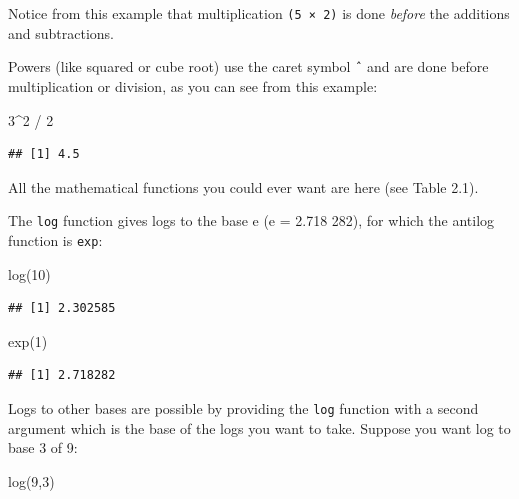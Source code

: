 \documentclass[
]{book}
\newenvironment{Shaded}{\begin{snugshade}}{\end{snugshade}}
\newcommand{\DecValTok}[1]{\textcolor[rgb]{0.00,0.00,0.81}{#1}}
\newcommand{\FunctionTok}[1]{\textcolor[rgb]{0.00,0.00,0.00}{#1}}
\newcommand{\NormalTok}[1]{#1}
\newcommand{\SpecialCharTok}[1]{\textcolor[rgb]{0.00,0.00,0.00}{#1}}
\begin{document}
Notice from this example that multiplication \texttt{(5\ ×\ 2)} is done \emph{before} the additions and subtractions.

Powers (like squared or cube root) use the caret symbol \texttt{ˆ} and are done before multiplication or division, as you can see from this example:

\begin{Shaded}
\begin{Highlighting}[]
\DecValTok{3}\SpecialCharTok{\^{}}\DecValTok{2} \SpecialCharTok{/} \DecValTok{2}
\end{Highlighting}
\end{Shaded}

\begin{verbatim}
## [1] 4.5
\end{verbatim}

All the mathematical functions you could ever want are here (see Table 2.1).

The \texttt{log} function gives logs to the base e (e = 2.718 282), for which the antilog function is \texttt{exp}:

\begin{Shaded}
\begin{Highlighting}[]
\FunctionTok{log}\NormalTok{(}\DecValTok{10}\NormalTok{)}
\end{Highlighting}
\end{Shaded}

\begin{verbatim}
## [1] 2.302585
\end{verbatim}

\begin{Shaded}
\begin{Highlighting}[]
\FunctionTok{exp}\NormalTok{(}\DecValTok{1}\NormalTok{)}
\end{Highlighting}
\end{Shaded}

\begin{verbatim}
## [1] 2.718282
\end{verbatim}

Logs to other bases are possible by providing the \texttt{log} function with a second argument which is the base of the logs you want to take. Suppose you want log to base 3 of 9:

\begin{Shaded}
\begin{Highlighting}[]
\FunctionTok{log}\NormalTok{(}\DecValTok{9}\NormalTok{,}\DecValTok{3}\NormalTok{)}
\end{Highlighting}
\end{Shaded}
\end{document}

